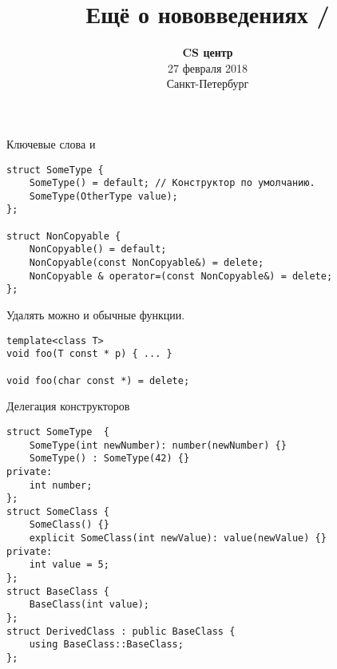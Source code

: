 \documentclass{beamer}
\title{Ещё о нововведениях \langcpp 11/\langcpp 14}
\date{
   \textbf{CS центр}\\
   27 февраля 2018 \\
   Санкт-Петербург
}
\begin{document}
\begin{frame} 
  \titlepage
\end{frame}

%


\begin{frame}[fragile]{Ключевые слова  и }
\begin{lstlisting}
struct SomeType {
    SomeType() = default; // Конструктор по умолчанию.
    SomeType(OtherType value);
};

struct NonCopyable {
    NonCopyable() = default;
    NonCopyable(const NonCopyable&) = delete;
    NonCopyable & operator=(const NonCopyable&) = delete;
};
\end{lstlisting}
\pause\medskip
Удалять можно и обычные функции.
\begin{lstlisting}
template<class T>
void foo(T const * p) { ... }

void foo(char const *) = delete;
\end{lstlisting}
\end{frame}

\begin{frame}[fragile]{Делегация конструкторов}
    \begin{lstlisting}
struct SomeType  {
    SomeType(int newNumber): number(newNumber) {}
    SomeType() : SomeType(42) {}
private:
    int number;
};
struct SomeClass {
    SomeClass() {}
    explicit SomeClass(int newValue): value(newValue) {}
private:
    int value = 5;
};
struct BaseClass {
    BaseClass(int value);
};
struct DerivedClass : public BaseClass {
    using BaseClass::BaseClass;
};
\end{lstlisting}
\end{frame}
\end{document}
